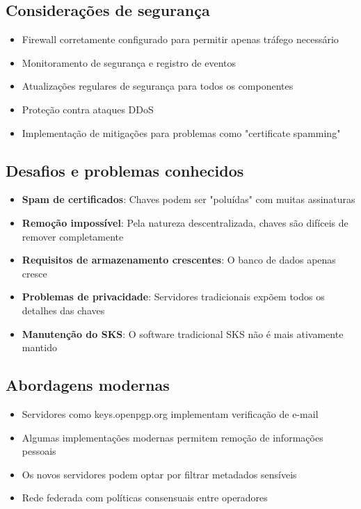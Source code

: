 \subsection{Considerações de segurança}
\begin{itemize}
    \item Firewall corretamente configurado para permitir apenas tráfego necessário
    \item Monitoramento de segurança e registro de eventos
    \item Atualizações regulares de segurança para todos os componentes
    \item Proteção contra ataques DDoS
    \item Implementação de mitigações para problemas como "certificate spamming" \cite{hansen2019poisoning}
\end{itemize}

\subsection{Desafios e problemas conhecidos}
\begin{itemize}
    \item \textbf{Spam de certificados}: Chaves podem ser "poluídas" com muitas assinaturas \cite{hansen2019poisoning}
    \item \textbf{Remoção impossível}: Pela natureza descentralizada, chaves são difíceis de remover completamente
    \item \textbf{Requisitos de armazenamento crescentes}: O banco de dados apenas cresce
    \item \textbf{Problemas de privacidade}: Servidores tradicionais expõem todos os detalhes das chaves
    \item \textbf{Manutenção do SKS}: O software tradicional SKS não é mais ativamente mantido \cite{sksdoc}
\end{itemize}

\subsection{Abordagens modernas}
\begin{itemize}
    \item Servidores como keys.openpgp.org implementam verificação de e-mail \cite{keysopenpgp}
    \item Algumas implementações modernas permitem remoção de informações pessoais
    \item Os novos servidores podem optar por filtrar metadados sensíveis
    \item Rede federada com políticas consensuais entre operadores
\end{itemize}

